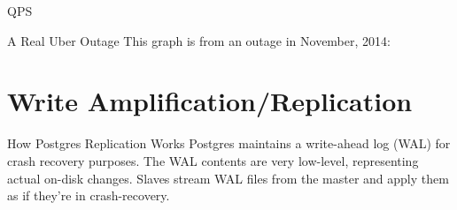 \documentclass[14pt]{beamer}
\begin{document}
\begin{frame}{QPS}
\end{frame}

\begin{frame}{A Real Uber Outage}
  This graph is from an outage in November, 2014:
  \newline
  \newline
\end{frame}

\section{Write Amplification/Replication}

\begin{frame}{How Postgres Replication Works}
  Postgres maintains a write-ahead log (WAL) for crash recovery purposes. The
  WAL contents are very low-level, representing actual on-disk changes.
  \newline
  \newline
  Slaves stream WAL files from the master and apply them as if they're in
  crash-recovery.
\end{frame}
\end{document}
